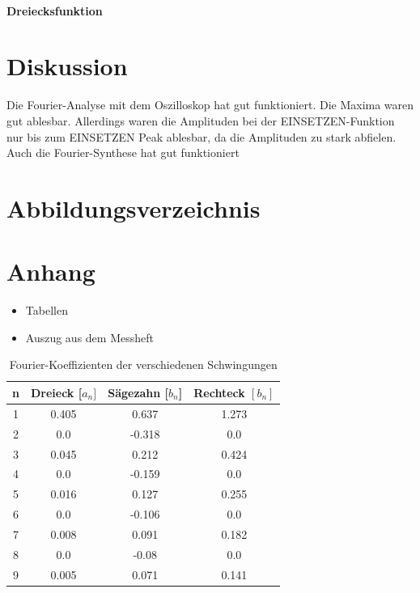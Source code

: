 \documentclass[11pt,ngerman,a4paper]{article}
\begin{document}
\paragraph{Dreiecksfunktion}
\paragraph{}

\section{Diskussion}
Die Fourier-Analyse mit dem Oszilloskop hat gut funktioniert. Die Maxima waren gut ablesbar. Allerdings waren die Amplituden bei der EINSETZEN-Funktion nur bis zum EINSETZEN Peak ablesbar, da die Amplituden zu stark abfielen. Auch die Fourier-Synthese hat gut funktioniert
\section{Abbildungsverzeichnis}
\section{Anhang}
\begin{itemize}
\item Tabellen
\item Auszug aus dem Messheft
\end{itemize}

\newpage
\begin{table}
\centering
\begin{tabular}{|c|c|c|c|}

\hline
n & Dreieck [$a_n]$ & S\"agezahn [$b_n$] & Rechteck $[b_n]$ \\
\hline
1 & 0.405 & 0.637 & 1.273\\
2 & 0.0 & -0.318 & 0.0\\
3 & 0.045 & 0.212 & 0.424\\
4 & 0.0 & -0.159 & 0.0\\
5 & 0.016 & 0.127 & 0.255\\
6 & 0.0 & -0.106 & 0.0\\
7 & 0.008 & 0.091 & 0.182\\
8 & 0.0 & -0.08 & 0.0\\
9 & 0.005 & 0.071 & 0.141\\
\hline
\end{tabular}
\label{table1}
\caption{Fourier-Koeffizienten der verschiedenen Schwingungen}
\end{table}
\end{document}

